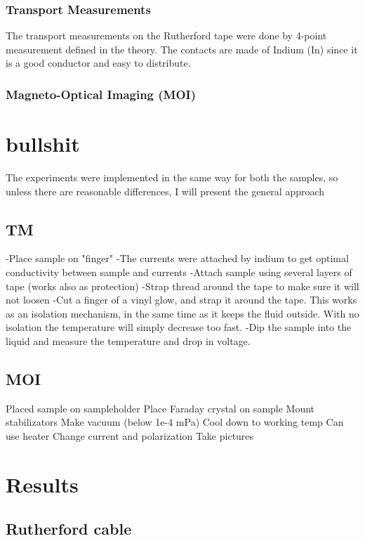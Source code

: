 \documentclass{comjnl}
\begin{document}
\subsubsection{Transport Measurements}
The transport measurements on the Rutherford tape were done by 4-point measurement defined in the theory. The contacts are made of Indium (In) since it is a good conductor and easy to distribute. 

\subsubsection{Magneto-Optical Imaging (MOI)}


\section{bullshit} \label{Sec:bullshit}
The experiments were implemented in the same way for both the samples, so unless there are reasonable differences, I will present the general approach

\subsection{TM}
-Place sample on "finger"
-The currents were attached by indium to get optimal conductivity between sample and currents
-Attach sample using several layers of tape (works also as protection)
-Strap thread around the tape to make sure it will not loosen
-Cut a finger of a vinyl glow, and strap it around the tape. This works as an isolation mechanism, in the same time as it keeps the fluid outside. With no isolation the temperature will simply decrease too fast.
-Dip the sample into the liquid and measure the temperature and drop in voltage.

\subsection{MOI}
Placed sample on sampleholder
Place Faraday crystal on sample
Mount stabilizators
Make vacuum (below 1e-4 mPa)
Cool down to working temp
Can use heater 
Change current and polarization
Take pictures


\section{Results}  \label{Sec:Results}
\subsection{Rutherford cable}
\end{document}

